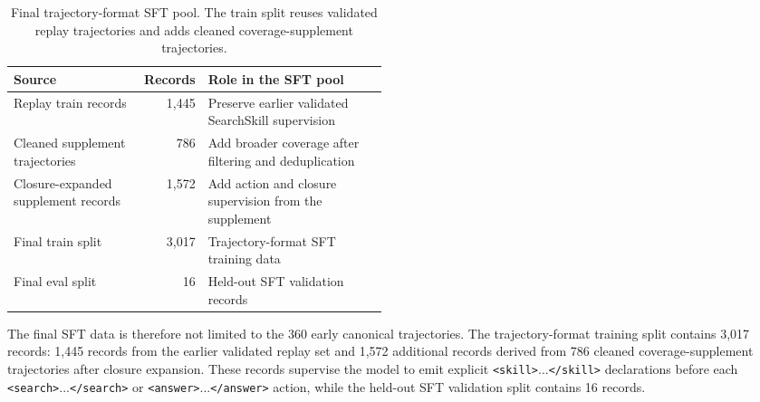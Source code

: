\documentclass{article}
\newcommand{\tagopen}[2]{\texttt{\textcolor{#1}{<#2>}}}
\newcommand{\tagclose}[2]{\texttt{\textcolor{#1}{</#2>}}}
\begin{document}
\begin{table}[tbp]
  \centering
  \caption{Final trajectory-format SFT pool. The train split reuses validated replay trajectories and adds cleaned coverage-supplement trajectories.}
  \label{tab:appendix-trajectory-sft-pool}
  \setlength{\tabcolsep}{5pt}
  \renewcommand{\arraystretch}{1.1}
  \small
  \begin{tabular}{lrp{0.48\linewidth}}
    \toprule
    \textbf{Source} & \textbf{Records} & \textbf{Role in the SFT pool} \\
    \midrule
    Replay train records & 1,445 & Preserve earlier validated SearchSkill supervision \\
    Cleaned supplement trajectories & 786 & Add broader coverage after filtering and deduplication \\
    Closure-expanded supplement records & 1,572 & Add action and closure supervision from the supplement \\
    Final train split & 3,017 & Trajectory-format SFT training data \\
    Final eval split & 16 & Held-out SFT validation records \\
    \bottomrule
  \end{tabular}
\end{table}

The final SFT data is therefore not limited to the 360 early canonical trajectories. The trajectory-format training split contains 3,017 records: 1,445 records from the earlier validated replay set and 1,572 additional records derived from 786 cleaned coverage-supplement trajectories after closure expansion. These records supervise the model to emit explicit \tagopen{skilltagcolor}{skill}...\tagclose{skilltagcolor}{skill} declarations before each \tagopen{searchtagcolor}{search}...\tagclose{searchtagcolor}{search} or \tagopen{answertagcolor}{answer}...\tagclose{answertagcolor}{answer} action, while the held-out SFT validation split contains 16 records.
\end{document}
